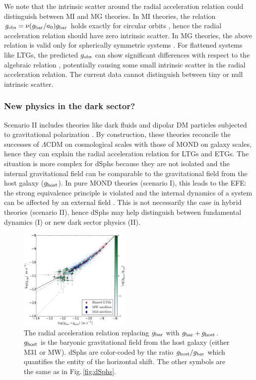 \documentclass[apjl, twocolappendix]{emulateapj}
\begin{document}
We note that the intrinsic scatter around the radial acceleration relation could distinguish between MI and MG theories. In MI theories, the relation $g_{\rm obs} = \nu(g_{\rm bar}/a_{0}) g_{\rm bar}$ holds exactly for circular orbits  \citep{Milgrom1994}, hence the radial acceleration relation should have zero intrinsic scatter. In MG theories, the above relation is valid only for spherically symmetric systems \citep{Bekenstein1984}. For flattened systems like LTGs, the predicted $g_{\rm obs}$ can show significant differences with respect to the algebraic relation \citep{Brada1995}, potentially causing some small intrinsic scatter in the radial acceleration relation. The current data cannot distinguish between tiny or null intrinsic scatter.

\subsubsection{New physics in the dark sector?}

Scenario II includes theories like dark fluids \citep{Zhao2010, Khoury2015} and dipolar DM particles subjected to gravitational polarization \citep{Blanchet2008, Blanchet2009}. By construction, these theories reconcile the successes of $\Lambda$CDM on cosmological scales with those of MOND on galaxy scales, hence they can explain the radial acceleration relation for LTGs and ETGs. The situation is more complex for dSphs because they are not isolated and the internal gravitational field can be comparable to the gravitational field from the host galaxy ($g_{\rm host}$). In pure MOND theories (scenario I), this leads to the EFE: the strong equivalence principle is violated and the internal dynamics of a system can be affected by an external field \citep{Bekenstein1984}. This is not necessarily the case in hybrid theories (scenario II), hence dSphs may help distinguish between fundamental dynamics (I) or new dark sector physics (II).

\begin{figure}[thb]
\centering
\includegraphics[width=0.48\textwidth]{RAR_EFE.pdf}
\caption{The radial acceleration relation replacing $g_{\rm bar}$ with $g_{\rm bar} + g_{\rm host}$. $g_{\rm host}$ is the baryonic gravitational field from the host galaxy (either M31 or MW). dSphs are color-coded by the ratio $g_{\rm host}/g_{\rm bar}$ which quantifies the entity of the horizontal shift. The other symbols are the same as in Fig.\,\ref{fig:dSphs}.}
\label{fig:EFE}
\end{figure}
\end{document}
